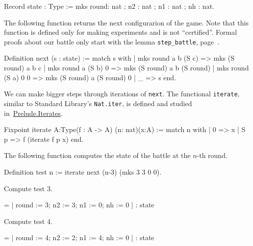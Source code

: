 \begin{Coqsrc}
 Record state : Type :=
    mks {round: nat ; n2 : nat ; n1 : nat ; nh : nat}.
\end{Coqsrc}

The following function returns the next configurarion of the game. 
Note that this function is defined only for making experiments and is not  ``certified''.  Formal proofs about our battle only start with the lemma
\texttt{step\_battle}, page~\pageref{lemma:step-battle}.


\begin{Coqsrc}
Definition next (s : state) :=
  match s with
  | mks round a b (S c) => mks (S round) a b c
  | mks round a (S b) 0 => mks (S round) a b (S round)
  | mks round (S a) 0 0 => mks (S round) a (S round) 0
  | _ => s
  end.
\end{Coqsrc}

We can make bigger steps through iterations of \texttt{next}.
The functional \texttt{iterate}, similar to Standard Library's \texttt{Nat.iter},
is defined and studied in~\href{../theories/html/hydras.Prelude.Iterates.html\#iterate}{Prelude.Iterates}.

\label{Functions:iterate}

\begin{Coqsrc}
Fixpoint iterate {A:Type}(f : A -> A) (n: nat)(x:A) :=
  match n with
  | 0 => x
  | S p => f (iterate  f p x)
  end.
\end{Coqsrc}



The following function computes the state of the battle at the $n$-th round.


\begin{Coqsrc}
Definition test n := iterate next (n-3) (mks 3 3 0 0).

Compute test 3.
\end{Coqsrc}

\begin{Coqanswer}
      = {| round := 3; n2 := 3; n1 := 0; nh := 0 |}
     : state 
\end{Coqanswer}

\begin{Coqsrc}
 Compute test 4.
\end{Coqsrc}

\begin{Coqanswer}
  = {| round := 4; n2 := 2; n1 := 4; nh := 0 |}
     : state
\end{Coqanswer}

